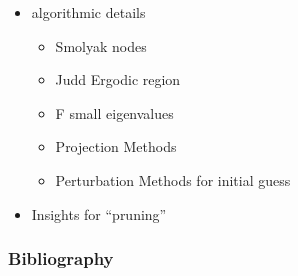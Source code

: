 \documentclass[tikz]{beamer}
\begin{document}
\begin{frame}
\begin{itemize}
\begin{itemize}
    \end{itemize}
\item algorithmic details
  \begin{itemize}
 \item Smolyak nodes
 \item Judd Ergodic region
 \item F small eigenvalues
 \item Projection Methods
 \item Perturbation Methods for initial guess
  \end{itemize}
\item Insights for ``pruning''
  \end{itemize}
\end{frame}

\begin{frame}
  \frametitle{Bibliography}
  


\end{frame}

\appendix
\end{document}
